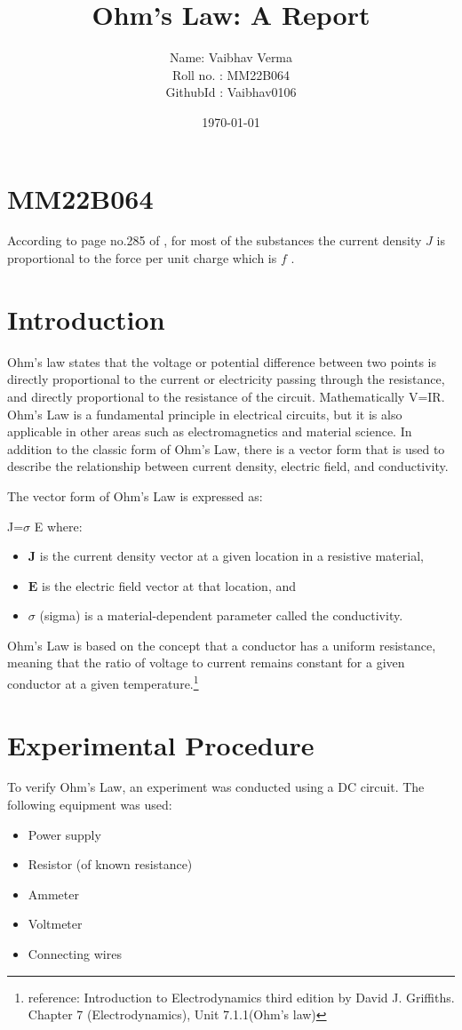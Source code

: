 \documentclass{article}
\title{Ohm's Law: A Report}
\author{Name: Vaibhav Verma \\ Roll no. : MM22B064 \\ GithubId : Vaibhav0106}
\date{\today}
\begin{document}
\maketitle

\section*{MM22B064}

According to page no.285 of \cite{griffiths}  , for most of the substances the current density $J$ is proportional to the force per unit charge which is $f$ .

\section*{Introduction}
Ohm’s law states that the voltage or potential difference between two points is directly proportional to the current or electricity passing through the resistance, and directly proportional to the resistance of the circuit.
Mathematically V=IR.
Ohm's Law is a fundamental principle in electrical circuits, but it is also applicable in other areas such as electromagnetics and material science. In addition to the classic form of Ohm's Law, there is a vector form that is used to describe the relationship between current density, electric field, and conductivity.

The vector form of Ohm's Law is expressed as:

J=$\sigma$ E
where:
\begin{itemize}
\item $\mathbf{J}$ is the current density vector at a given location in a resistive material,
\item $\mathbf{E}$ is the electric field vector at that location, and
\item $\sigma$ (sigma) is a material-dependent parameter called the conductivity.
\end{itemize}
Ohm's Law is based on the concept that a conductor has a uniform resistance, meaning that the ratio of voltage to current remains constant for a given conductor at a given temperature.\footnote{reference: Introduction to Electrodynamics third edition by David J. Griffiths. Chapter 7 (Electrodynamics), Unit 7.1.1(Ohm's law)} 

\section{Experimental Procedure}
To verify Ohm's Law, an experiment was conducted using a DC circuit. The following equipment was used:
\begin{itemize}
  \item Power supply
  \item Resistor (of known resistance)
  \item Ammeter
  \item Voltmeter
  \item Connecting wires
\end{itemize}
\end{document}
